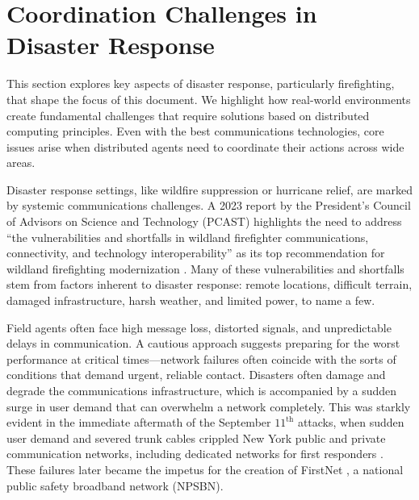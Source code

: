 \documentclass[]             %
{NASA}                       %
\theoremstyle{definition}
\begin{document}
\section{Coordination Challenges in Disaster Response}
\label{sec:disaster-response}
This section explores key aspects of disaster response, particularly
firefighting, that shape the focus of this document. We highlight how
real-world environments create fundamental challenges that require
solutions based on distributed computing principles. Even with the
best communications technologies, core issues arise when distributed
agents need to coordinate their actions across wide areas.

Disaster response settings, like wildfire suppression or hurricane
relief, are marked by systemic communications challenges. A 2023
report by the President’s Council of Advisors on Science and
Technology (PCAST) highlights the need to address ``the
vulnerabilities and shortfalls in wildland firefighter communications,
connectivity, and technology interoperability'' as its top
recommendation for wildland firefighting modernization
\cite{pcast2023}. Many of these vulnerabilities and shortfalls stem
from factors inherent to disaster response: remote locations,
difficult terrain, damaged infrastructure, harsh weather, and limited
power, to name a few.

Field agents often face high message loss, distorted signals, and
unpredictable delays in communication. A cautious approach suggests
preparing for the worst performance at critical times---network
failures often coincide with the sorts of conditions that demand
urgent, reliable contact. Disasters often damage and degrade the
communications infrastructure, which is accompanied by a sudden surge
in user demand that can overwhelm a network completely. This was
starkly evident in the immediate aftermath of the September
$11^\textrm{th}$ attacks, when sudden user demand and severed trunk
cables crippled New York public and private communication networks,
including dedicated networks for first responders
\cite{2011:Reardon}. These failures later became the impetus for the
creation of FirstNet \cite{2021:firstnet, 2021:firstnet2}, a national
public safety broadband network (NPSBN).
\end{document}
